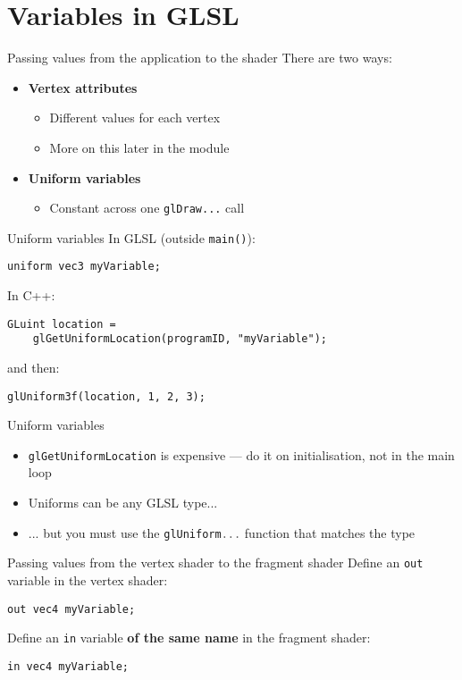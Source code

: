 \part{Variables in GLSL}
\frame{\partpage}

\begin{frame}{Passing values from the application to the shader}
	There are two ways:
	\begin{itemize}
		\pause\item \textbf{Vertex attributes}
			\begin{itemize}
				\pause\item Different values for each vertex
				\pause\item More on this later in the module
			\end{itemize}
		\pause\item \textbf{Uniform variables}
			\begin{itemize}
				\pause\item Constant across one \lstinline{glDraw...} call
			\end{itemize}
	\end{itemize}
\end{frame}

\begin{frame}[fragile]{Uniform variables}
	\pause In GLSL (outside \lstinline{main()}):
	\begin{lstlisting}
uniform vec3 myVariable;
	\end{lstlisting}
	\pause In C++:
	\begin{lstlisting}
GLuint location =
	glGetUniformLocation(programID, "myVariable");
	\end{lstlisting}
	\pause and then:
	\begin{lstlisting}
glUniform3f(location, 1, 2, 3);
	\end{lstlisting}
\end{frame}

\begin{frame}{Uniform variables}
	\begin{itemize}
		\pause\item \lstinline[language=C++]{glGetUniformLocation} is expensive --- do it on initialisation, not in the main loop
		\pause\item Uniforms can be any GLSL type...
		\pause\item ... but you must use the \lstinline[language=C++]{glUniform...} function that matches the type
	\end{itemize}
\end{frame}

\begin{frame}[fragile]{Passing values from the vertex shader to the fragment shader}
	\pause Define an \lstinline{out} variable in the vertex shader:
	\pause \begin{lstlisting}
out vec4 myVariable;
	\end{lstlisting}
	\pause Define an \lstinline{in} variable \textbf{of the same name} in the fragment shader:
	\pause \begin{lstlisting}
in vec4 myVariable;
	\end{lstlisting}
\end{frame}
